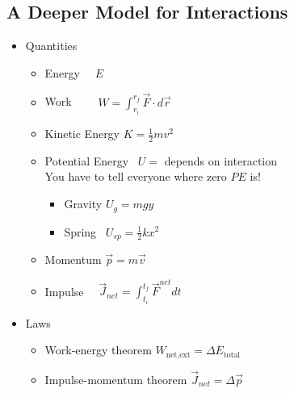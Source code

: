 \documentclass[]{article}
\begin{document}
\begin{PresentSpace}
\vspace{-10pt}
\section*{A Deeper Model for Interactions}
\vspace{-10pt}
\begin{itemize}
	\item Quantities
	\begin{itemize}
		\item Energy \qquad \qquad \qquad \quad \ \ $E$
		\item Work \qquad \qquad \qquad \quad \ \ \ \ $W = \int_{r_{i}}^{r_{f}}\vec{F}\cdot d\vec{r}$
		\item Kinetic Energy \qquad \qquad $K=\frac{1}{2}mv^{2}$
		\item Potential Energy \qquad \quad \ $U=$ depends on interaction \\
		You have to tell everyone where zero $PE$ is!
		\begin{itemize}
			\item Gravity \qquad $U_{g} = mgy$
			\item Spring \qquad \ $U_{sp} = \frac{1}{2}kx^{2}$
		\end{itemize}
		\item Momentum \qquad \qquad \qquad $\vec{p}=m\vec{v}$
		\item Impulse \qquad \qquad \quad \quad \ \ $\vec{J}_{net}=\int_{t_{i}}^{t_{f}}\vec{F}^{net}dt$
	\end{itemize}
	\item Laws
	\begin{itemize}
		\item Work-energy theorem \qquad $W_{\text{net,ext}} = \Delta E_{\text{total}}$
		\item Impulse-momentum theorem \qquad $\vec{J}_{net} = \Delta\vec{p}$
	\end{itemize}
\end{itemize}
\end{PresentSpace}
\newpage
\end{document}
